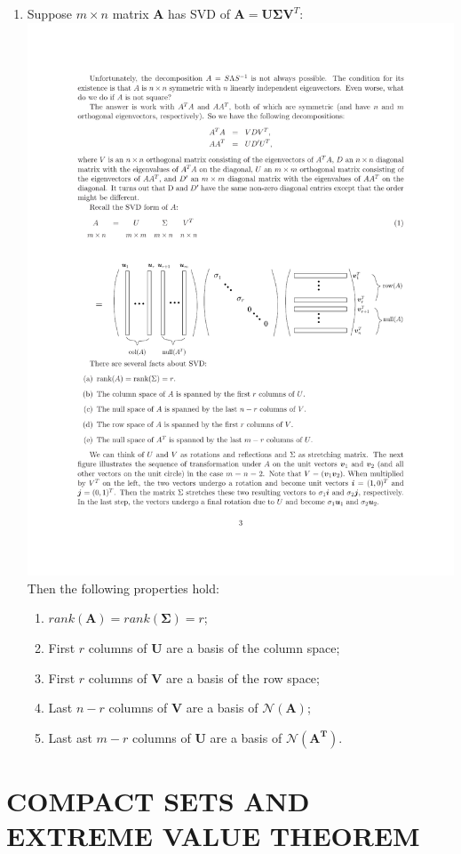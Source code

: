 \documentclass[%
 aip,
 jmp,%
 amsmath,amssymb,
 reprint,%
]{revtex4-1}
\newcommand{\mat}[1]{\bm{#1}}
\newcommand{\N}{\mathcal{N}}    %
\begin{document}
\begin{enumerate}
\item Suppose $m \times n$ matrix $\mat{A}$ has SVD of $\mat{A}=\mat{U}\mat{\Sigma}\mat{V}^T$:
\includegraphics[scale=0.5]{svd.pdf}
Then the following properties hold:
    \begin{enumerate}
        \item $ rank(\mat{A}) = rank(\mat{\Sigma}) = r $;
        \item First $r$ columns of $\mat{U}$ are a basis of the column space;
        \item First $r$ columns of $\mat{V}$ are a basis of the row space;
        \item Last $n - r$ columns of $\mat{V}$ are a basis of $\N(\mat{A})$;
        \item Last ast $m - r$ columns of $\mat{U}$ are a basis of $\N(\mat{A^T})$.
    \end{enumerate}


\end{enumerate}

\section{COMPACT SETS AND EXTREME VALUE THEOREM}
\end{document}
